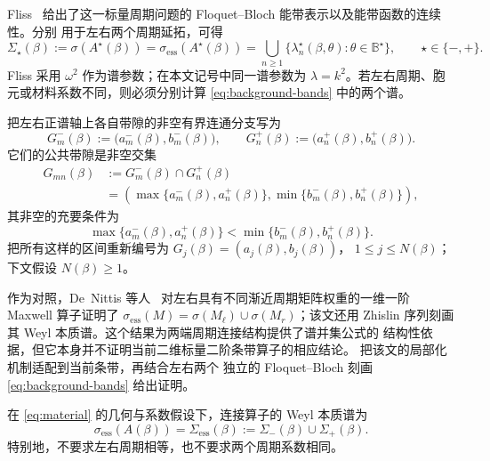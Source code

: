 Fliss~\cite[Proposition~3.1, especially equations~(3.3)--(3.4)]{Fliss2013}
给出了这一标量周期问题的 Floquet--Bloch 能带表示以及能带函数的连续性。分别
用于左右两个周期延拓，可得
\begin{equation}
  \Sigma_\star(\beta)
  :=\sigma(A^\star(\beta))
  =\sigma_{\mathrm{ess}}(A^\star(\beta))
  =\bigcup_{n\geq1}
    \bigl\{\lambda_n^\star(\beta,\theta):
    \theta\in\mathbb B^\star\bigr\},
  \qquad \star\in\{-,+\}.
  \label{eq:background-bands}
\end{equation}
Fliss 采用 $\omega^2$ 作为谱参数；在本文记号中同一谱参数为
$\lambda=k^2$。若左右周期、胞元或材料系数不同，则必须分别计算
\eqref{eq:background-bands} 中的两个谱。

把左右正谱轴上各自带隙的非空有界连通分支写为
\[
  G_m^-(\beta)
  :=\bigl(a_m^-(\beta),b_m^-(\beta)\bigr),
  \qquad
  G_n^+(\beta)
  :=\bigl(a_n^+(\beta),b_n^+(\beta)\bigr).
\]
它们的公共带隙是非空交集
\begin{equation}
\begin{aligned}
  G_{mn}(\beta)
  &:=G_m^-(\beta)\cap G_n^+(\beta)\\
  &=\left(
    \max\{a_m^-(\beta),a_n^+(\beta)\},
    \min\{b_m^-(\beta),b_n^+(\beta)\}
    \right),
  \label{eq:common-gap-intersection}
\end{aligned}
\end{equation}
其非空的充要条件为
\[
  \max\{a_m^-(\beta),a_n^+(\beta)\}
  <\min\{b_m^-(\beta),b_n^+(\beta)\}.
\]
把所有这样的区间重新编号为
$G_j(\beta)=(a_j(\beta),b_j(\beta))$，
$1\leq j\leq N(\beta)$；下文假设 $N(\beta)\geq1$。

作为对照，De~Nittis 等人~
\cite[Proposition~3.10 and Lemma~3.12]{DeNittisEtAl2021}
对左右具有不同渐近周期矩阵权重的一维一阶 Maxwell 算子证明了
$\sigma_{\mathrm{ess}}(M)=\sigma(M_\ell)\cup\sigma(M_r)$；该文还用
Zhislin 序列刻画其 Weyl 本质谱。这个结果为两端周期连接结构提供了谱并集公式的
结构性依据，但它本身并不证明当前二维标量二阶条带算子的相应结论。
 把该文的局部化机制适配到当前条带，再结合左右两个
独立的 Floquet--Bloch 刻画 \eqref{eq:background-bands} 给出证明。

\begin{theorem}[两个不同周期半波导对应的本质谱]
\label{thm:two-ended-essential-spectrum}
\label{prop:asymmetric-essential-spectrum}
在 \eqref{eq:material} 的几何与系数假设下，连接算子的 Weyl 本质谱为
\begin{equation}
  \sigma_{\mathrm{ess}}(A(\beta))
  =\Sigma_{\mathrm{ess}}(\beta)
  :=\Sigma_-(\beta)\cup\Sigma_+(\beta).
  \label{eq:projected-spectrum}
\end{equation}
特别地，不要求左右周期相等，也不要求两个周期系数相同。
\end{theorem}

